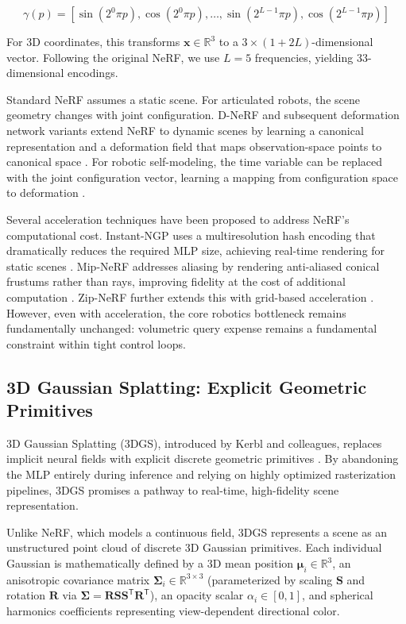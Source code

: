 \documentclass[12pt,a4paper,oneside]{report}
\begin{document}
\begin{equation}
\gamma(p) = [\sin(2^0 \pi p), \cos(2^0 \pi p), \ldots, \sin(2^{L-1} \pi p), \cos(2^{L-1} \pi p)]
\end{equation}

For 3D coordinates, this transforms $\mathbf{x} \in \mathbb{R}^3$ to a $3 \times (1 + 2L)$-dimensional vector. Following the original NeRF, we use $L = 5$ frequencies, yielding 33-dimensional encodings.

Standard NeRF assumes a static scene. For articulated robots, the scene geometry changes with joint configuration. D-NeRF and subsequent deformation network variants extend NeRF to dynamic scenes by learning a canonical representation and a deformation field that maps observation-space points to canonical space \cite{pumarola2021d, park2021nerfies}. For robotic self-modeling, the time variable can be replaced with the joint configuration vector, learning a mapping from configuration space to deformation \cite{hu2024teaching}.

Several acceleration techniques have been proposed to address NeRF's computational cost. Instant-NGP uses a multiresolution hash encoding that dramatically reduces the required MLP size, achieving real-time rendering for static scenes \cite{muller2022instant}. Mip-NeRF addresses aliasing by rendering anti-aliased conical frustums rather than rays, improving fidelity at the cost of additional computation \cite{barron2021mip}. Zip-NeRF further extends this with grid-based acceleration \cite{barron2023zipnerf}. However, even with acceleration, the core robotics bottleneck remains fundamentally unchanged: volumetric query expense remains a fundamental constraint within tight control loops.

\subsection{3D Gaussian Splatting: Explicit Geometric Primitives}

3D Gaussian Splatting (3DGS), introduced by Kerbl and colleagues, replaces implicit neural fields with explicit discrete geometric primitives \cite{kerbl20233d}. By abandoning the MLP entirely during inference and relying on highly optimized rasterization pipelines, 3DGS promises a pathway to real-time, high-fidelity scene representation.

Unlike NeRF, which models a continuous field, 3DGS represents a scene as an unstructured point cloud of discrete 3D Gaussian primitives. Each individual Gaussian is mathematically defined by a 3D mean position $\boldsymbol{\mu}_i \in \mathbb{R}^3$, an anisotropic covariance matrix $\boldsymbol{\Sigma}_i \in \mathbb{R}^{3 \times 3}$ (parameterized by scaling $\mathbf{S}$ and rotation $\mathbf{R}$ via $\boldsymbol{\Sigma} = \mathbf{R} \mathbf{S} \mathbf{S}^\mathsf{T} \mathbf{R}^\mathsf{T}$), an opacity scalar $\alpha_i \in [0, 1]$, and spherical harmonics coefficients representing view-dependent directional color.
\end{document}

